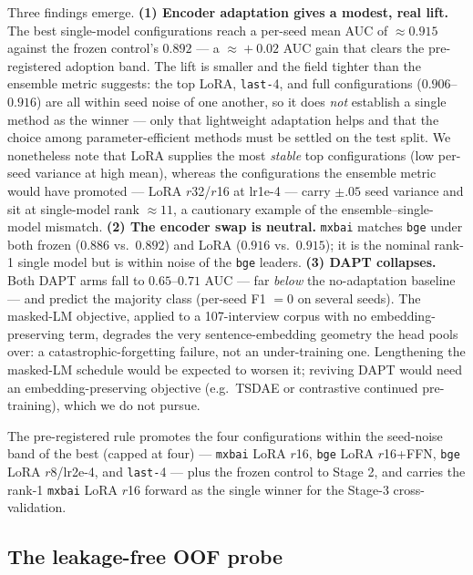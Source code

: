 Three findings emerge. \textbf{(1) Encoder adaptation gives a modest, real
lift.} The best single-model configurations reach a per-seed mean AUC of
$\approx\!0.915$ against the frozen control's $0.892$ --- a $\approx\!+0.02$ AUC
gain that clears the pre-registered adoption band. The lift is smaller and the
field tighter than the ensemble metric suggests: the top LoRA, \texttt{last-}4,
and full configurations ($0.906$--$0.916$) are all within seed noise of one
another, so it does \emph{not} establish a single method as the winner
--- only that lightweight adaptation helps and that the choice among
parameter-efficient methods must be settled on the test split. We nonetheless
note that LoRA supplies the most \emph{stable} top configurations (low per-seed
variance at high mean), whereas the configurations the ensemble metric would
have promoted --- LoRA $r$32/$r$16 at lr1e-4 --- carry $\pm.05$ seed variance and
sit at single-model rank $\approx\!11$, a cautionary example of the
ensemble--single-model mismatch. \textbf{(2) The encoder swap is neutral.}
\texttt{mxbai} matches \texttt{bge} under both frozen ($0.886$ vs.\ $0.892$) and
LoRA ($0.916$ vs.\ $0.915$); it is the nominal rank-1 single model but is within
noise of the \texttt{bge} leaders. \textbf{(3) DAPT collapses.} Both DAPT arms
fall to $0.65$--$0.71$ AUC --- far \emph{below} the no-adaptation baseline ---
and predict the majority class (per-seed F1 $=0$ on several seeds). The
masked-LM objective, applied to a 107-interview corpus with no
embedding-preserving term, degrades the very sentence-embedding geometry the head
pools over: a catastrophic-forgetting failure, not an under-training one.
Lengthening the masked-LM schedule would be expected to worsen it; reviving DAPT
would need an embedding-preserving objective (e.g.\ TSDAE or contrastive
continued pre-training), which we do not pursue.

The pre-registered rule promotes the four configurations within the seed-noise
band of the best (capped at four) --- \texttt{mxbai} LoRA $r$16,
\texttt{bge} LoRA $r$16+FFN, \texttt{bge} LoRA $r$8/lr2e-4, and \texttt{last-}4 ---
plus the frozen control to Stage 2, and carries the rank-1 \texttt{mxbai} LoRA
$r$16 forward as the single winner for the Stage-3 cross-validation.

\subsection{The leakage-free OOF probe}
\label{sec:finetune-iter1-oof}

